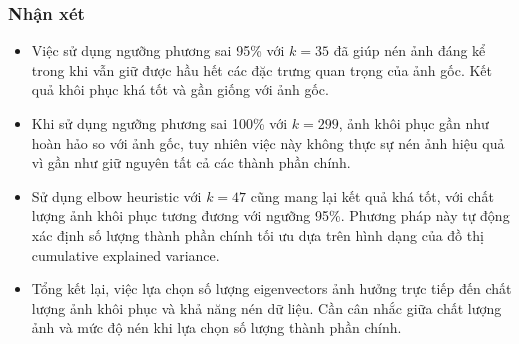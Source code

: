         \subsubsection{Nhận xét}
            \begin{itemize}
                \item Việc sử dụng ngưỡng phương sai 95\% với $k=35$ đã giúp nén ảnh đáng kể trong khi vẫn giữ được hầu hết các đặc trưng quan trọng của ảnh gốc. Kết quả khôi phục khá tốt và gần giống với ảnh gốc.
                \item Khi sử dụng ngưỡng phương sai 100\% với $k=299$, ảnh khôi phục gần như hoàn hảo so với ảnh gốc, tuy nhiên việc này không thực sự nén ảnh hiệu quả vì gần như giữ nguyên tất cả các thành phần chính.
                \item Sử dụng elbow heuristic với $k=47$ cũng mang lại kết quả khá tốt, với chất lượng ảnh khôi phục tương đương với ngưỡng 95\%. Phương pháp này tự động xác định số lượng thành phần chính tối ưu dựa trên hình dạng của đồ thị cumulative explained variance.
                \item Tổng kết lại, việc lựa chọn số lượng eigenvectors ảnh hưởng trực tiếp đến chất lượng ảnh khôi phục và khả năng nén dữ liệu. Cần cân nhắc giữa chất lượng ảnh và mức độ nén khi lựa chọn số lượng thành phần chính.    
            \end{itemize}
            
            
            